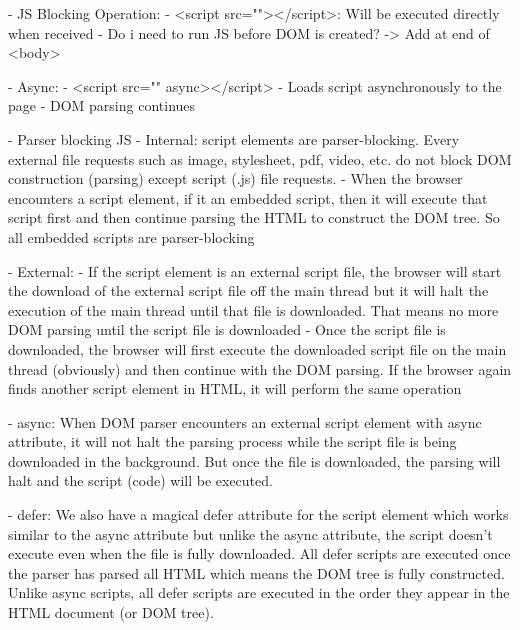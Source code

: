 

- JS Blocking Operation:
	- <script src=""></script>: Will be executed directly when received
	- Do i need to run JS before DOM is created?
	-> Add at end of <body>

- Async:
	- <script src="" async></script>
	- Loads script asynchronously to the page
	- DOM parsing continues
	
	




- Parser blocking JS
- Internal: script elements are parser-blocking. Every external file requests such as image, stylesheet, pdf, video, etc. do not block DOM construction (parsing) except script (.js) file requests.
- When the browser encounters a script element, if it an embedded script, then it will execute that script first and then continue parsing the HTML to construct the DOM tree. So all embedded scripts are parser-blocking

- External:
- If the script element is an external script file, the browser will start the download of the external script file off the main thread but it will halt the execution of the main thread until that file is downloaded. That means no more DOM parsing until the script file is downloaded
- Once the script file is downloaded, the browser will first execute the downloaded script file on the main thread (obviously) and then continue with the DOM parsing. If the browser again finds another script element in HTML, it will perform the same operation

- async:
When DOM parser encounters an external script element with async attribute, it will not halt the parsing process while the script file is being downloaded in the background. But once the file is downloaded, the parsing will halt and the script (code) will be executed.


- defer:
We also have a magical defer attribute for the script element which works similar to the async attribute but unlike the async attribute, the script doesn’t execute even when the file is fully downloaded. All defer scripts are executed once the parser has parsed all HTML which means the DOM tree is fully constructed. Unlike async scripts, all defer scripts are executed in the order they appear in the HTML document (or DOM tree).


